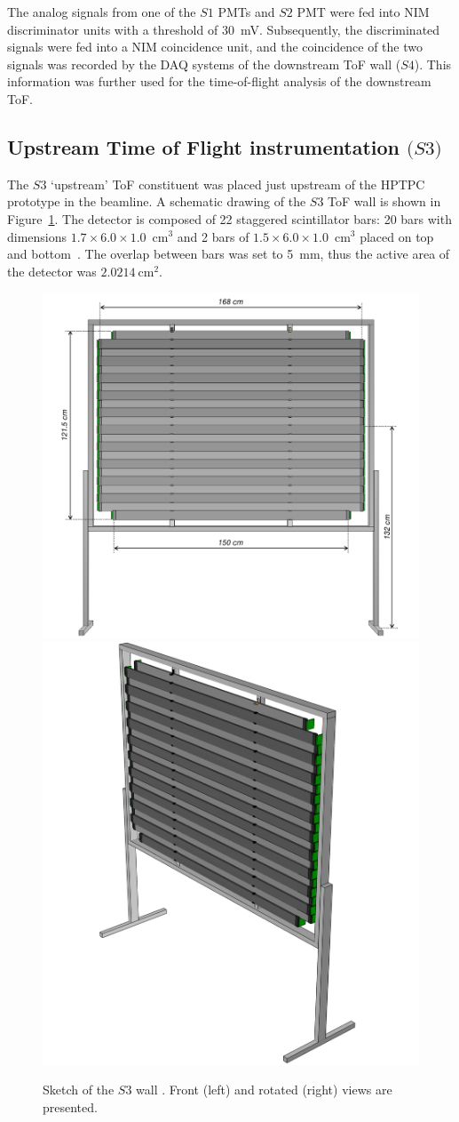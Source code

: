 The analog signals from one of the $\mathit{S1}$ PMTs and $\mathit{S2}$ PMT were fed into NIM discriminator units with a threshold of 30~mV.
Subsequently, the discriminated signals were fed into a NIM coincidence unit, and the coincidence of the two signals was recorded by the DAQ systems of the downstream ToF wall ($\mathit{S4}$).
This information was further used for the time-of-flight analysis of the downstream ToF.

\subsection{Upstream Time of Flight instrumentation $\mathit(S3)$}
\label{subsec:s3Exp}
The $\mathit{S3}$ `upstream' ToF constituent was placed just upstream of the HPTPC prototype in the beamline.
A schematic drawing of the $\mathit{S3}$ ToF wall is shown in Figure~\ref{fig:S3sketch}.
The detector is composed of 22 staggered scintillator bars:  20 bars with dimensions $1.7 \times 6.0 \times 1.0$~cm$^3$ and 2 bars of  $1.5 \times 6.0 \times 1.0$~cm$^3$ placed on top and bottom~\cite{S3-proceedings}.
The overlap between bars was set to 5~mm, thus the active area of the detector was $2.0214~\text{cm}^{2}$.

\begin{figure}
  \centering
  \includegraphics[width=0.54\linewidth]{files/Figures/uToF_sketch.pdf}
  \hfill
  \includegraphics[width=0.43\linewidth]{files/Figures/uTOF_rot.pdf}
  \caption{Sketch of the $\mathit{S3}$ wall \cite{S3-proceedings}.
  Front (left) and rotated (right) views are presented.}
  \label{fig:S3sketch}
\end{figure}

